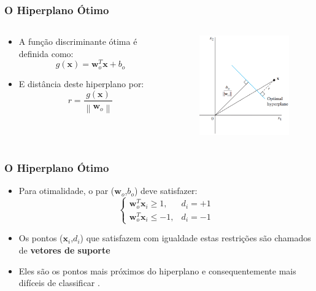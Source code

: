 \documentclass{beamer}
\begin{document}
\begin{frame}
	\frametitle{O Hiperplano Ótimo}
	\begin{columns}
		\begin{column}{0.5\textwidth}  
			\begin{center}
				\begin{itemize}
					\item A função discriminante ótima é definida como:
					\begin{equation}
						g(\textbf{x}) = \textbf{w}^T_o\textbf{x} + b_o
						\label{eq:plano-opt}
					\end{equation}		
					\item E distância deste hiperplano por:
					\begin{equation}
						r = \frac{g(\textbf{x})}{\left \| \textbf{w}_o \right \|} 
						\label{eq:plano-dist}
					\end{equation}		
				\end{itemize}
			\end{center}
		\end{column}
		\begin{column}{0.5\textwidth}
			\begin{figure}[h!]
				\centering
				\includegraphics[width=2in]{fig04.png}
				\label{fig:haykin-03}
			\end{figure}
		\end{column}
	\end{columns}
\end{frame}


\begin{frame}
	\frametitle{O Hiperplano Ótimo}
	\begin{itemize}
		\item Para otimalidade, o par ($\textbf{w}_o$,$b_o$) deve satisfazer:
		\begin{equation}
		\begin{cases}
			\textbf{w}^T_o\textbf{x}_i \geq 1, & d_i = +1 \\ 
			\textbf{w}^T_o\textbf{x}_i \leq -1, & d_i = -1
		\end{cases}
		\label{eq:plano-cond}
		\end{equation}
		\item Os pontos ($\textbf{x}_i$,$d_i$) que satisfazem com igualdade estas restrições são chamados de \textbf{vetores de suporte}
		\item Eles são os pontos mais próximos do hiperplano e consequentemente mais difíceis de classificar \cite{haykin}.
	\end{itemize}

\end{frame}
\end{document}
